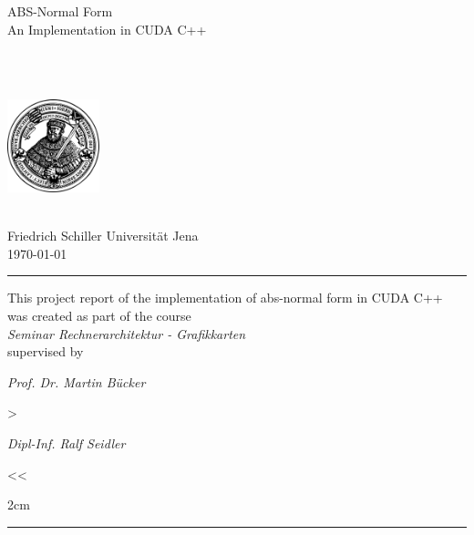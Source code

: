 \huge
ABS-Normal Form \\ An Implementation in CUDA C++ \\

\vspace{1cm}

\normalsize
\authorName \\
\email \\


\begin{center}
	\includegraphics[width=0.2\textwidth]{img/hanfried.png}
\end{center}
\hfill \\
Friedrich Schiller Universität Jena \\
\vspace{0.5cm}
\monthyeardate\today
\vspace{0.5cm}
\hrule
\vspace{0.5cm}
This project report of the implementation of abs-normal form in CUDA C++ was created as part of the course\\[0.1cm]
\emph{Seminar Rechnerarchitektur - Grafikkarten}\\[0.1cm]
supervised by\\[0.1cm]
\hfill
\begin{minipage}[t][][c]{0.3\textwidth}
	\raggedright{\emph{Prof. Dr. Martin Bücker}}
\end{minipage}
{>}
\begin{minipage}[t][][c]{0.3\textwidth}
	\begin{center}
		\emph{Dipl-Inf. Ralf Seidler}
	\end{center}
\end{minipage}
{<<}
\begin{minipage}[t][][c]{0.3\textwidth}
\end{minipage}
\hfill{2cm}

\vfill
\hrule
\vspace{0.5cm}
\begin{abstract}
	\itshape
	
\end{abstract}
\newpage